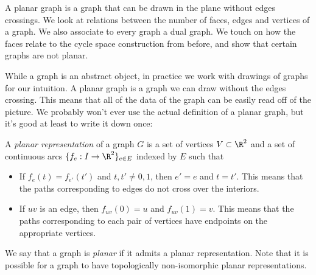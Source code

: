 
\begin{elevator}[Planarity]
A planar graph is a graph that can be drawn in the plane without edges crossings. We look at relations between the number of faces, edges and vertices of a graph. 
We also associate to every graph a dual graph. 
We touch on how the faces relate to the cycle space construction from before, and show that certain graphs are not planar. 
\label{sec:planar:planar}
\end{elevator}

While a graph is an abstract object, in practice we work with drawings of graphs for our intuition. A planar graph is a graph we can draw without the edges crossing. 
This means that all of the data of the graph can be easily read off of the picture.
We probably won't ever use the actual definition of a planar graph, but it's good at least to write it down once:
\begin{definition}
 A \emph{planar representation} of a graph $G$ is a set of vertices $V\subset \R^2$ and a set of continuous arcs $\{f_e: I\to \R^2\}_{e\in E}$ indexed by $E$ such that
 \begin{itemize}
  \item 
    If $f_{e}(t)=f_{e'}(t')$ and $t, t'\neq 0,1$,  then $e'=e$ and $t=t'$. 
    This means that the paths corresponding to edges do not cross over the interiors.  
  \item 
    If $uv$ is an edge, then $f_{uv}(0)=u$ and $f_{uv}(1)=v$. 
    This means that the paths corresponding to each pair of vertices have endpoints on the appropriate vertices.
 \end{itemize}
\end{definition}
We say that a graph is \emph{planar} if it admits a planar representation.
Note that it is possible for a graph to have topologically non-isomorphic planar representations. 

